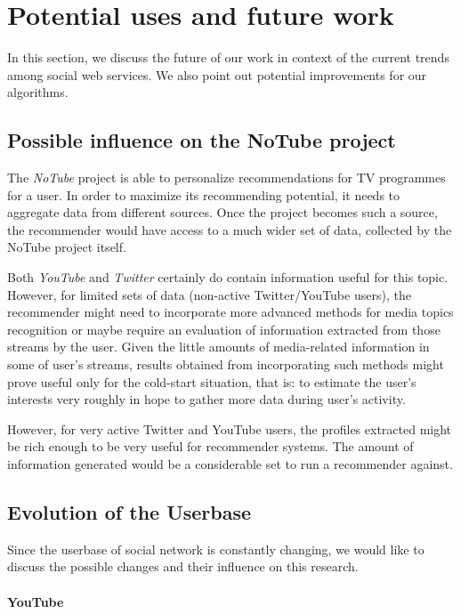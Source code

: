 \section{Potential uses and future work}

In this section, we discuss the future of our work in context of the current
trends among social web services. We also point out potential improvements for
our algorithms.

\subsection{Possible influence on the NoTube project}

The \textit{NoTube} project is able to personalize recommendations for TV
programmes for a user. In order to maximize its recommending potential, it
needs to aggregate data from different sources. Once the project becomes such a
source, the recommender would have access to a much wider set of data,
collected by the NoTube project itself.

Both \textit{YouTube} and \textit{Twitter} certainly do contain information
useful for this topic. However, for limited sets of data (non-active
Twitter/YouTube users), the recommender might need to 
incorporate more advanced methods for media topics recognition or maybe require
an evaluation of information extracted from those streams by the user.
Given the little amounts of media-related information in some of user's
streams, results obtained from incorporating such methods might prove useful
only for the cold-start situation, that is: to estimate the user's interests
very roughly in hope to gather more data during user's activity.

However, for very active Twitter and YouTube users, the profiles extracted
might be rich enough to be very useful for recommender systems. The amount of
information generated would be a considerable set to run a recommender against.

\subsection{Evolution of the Userbase}

Since the userbase of social network is constantly changing, we would like to
discuss the possible changes and their influence on this research.

\paragraph{YouTube}


